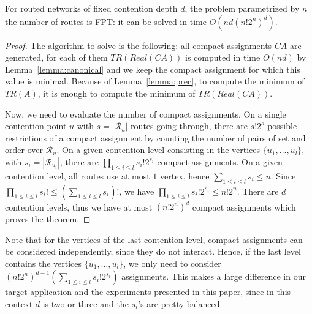\documentclass[english]{article}
\begin{document}

\begin{theorem}\label{theorem:FPT}
For routed networks of fixed contention depth $d$, the problem \spall parametrized by $n$ the number of routes is FPT: it can be solved in time $O(nd(n!2^{n})^{d})$.
\end{theorem}
\begin{proof}
The algorithm to solve \spall is the following: all compact assignments $CA$ are generated, for each of them $TR(Real(CA))$ is computed in time
$O(nd)$ by Lemma~\ref{lemma:canonical} and we keep the compact assignment for which this value is minimal.  Because of Lemma~\ref{lemma:prec}, to compute the minimum of $TR(A)$, it is enough 
to compute the minimum of $TR(Real(CA))$.

 Now, we need to evaluate the number of compact assignments. 
On a single contention point $u$ with $s = |\mathcal{R}_u|$ routes going through, there are $s!2^s$ possible restrictions of a compact assignment by counting the number of pairs of set and order over $\mathcal{R}_u$.
On a given contention level consisting in the vertices $\{u_1,\dots,u_l\}$, with $s_i = |\mathcal{R}_{u_{i}}|$, there are 
$\prod_{1 \leq i\leq l} s_i!2^{s_i}$ compact assignments. On a given contention level, all routes use at most $1$ vertex, hence $\sum_{1 \leq i\leq l} s_i \leq n$. Since $\prod_{1 \leq i\leq l} s_i! \leq (\sum_{1 \leq i\leq l} s_i)!$, we have $\prod_{1 \leq i\leq l} s_i!2^{s_i} \leq n!2^n$. There are $d$ contention levels, thus we have at most $ (n!2^{n})^{d}$ compact assignments which proves the theorem.
\end{proof}

Note that for the vertices of the last contention level, compact assignments can be considered independently, since
they do not interact. Hence, if the last level contains the vertices $\{u_1,\dots,u_l\}$, we only need to consider $(n!2^{n})^{d-1}(\sum_{1 \leq i\leq l} s_i!2^{s_i})$ assignments. This makes a large difference in our target application and the experiments presented in this paper, since in this context $d$ is two or three and the $s_i$'s are pretty balanced.
\end{document}
